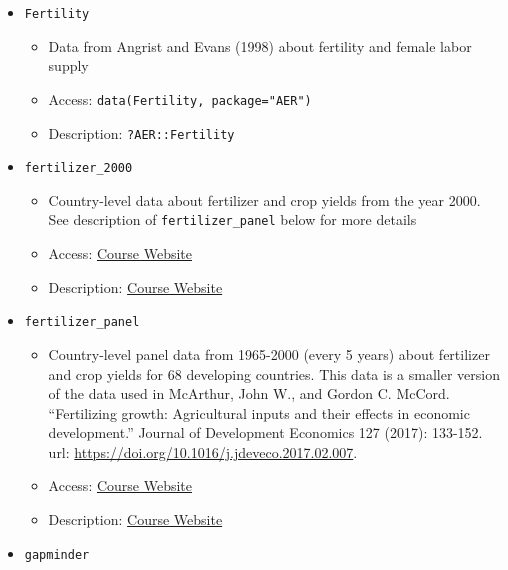 \documentclass[
  letterpaper,
  DIV=11,
  numbers=noendperiod]{scrreprt}
\begin{document}
\begin{itemize}
  \begin{itemize}
  \item
    State-level panel data about drunk driving laws and traffic
    fatalities
  \item
    Access: \texttt{data(Fatality,\ package="AER")}
  \item
    Description: \texttt{?AER::Fatality}
  \end{itemize}
\item
  \texttt{Fertility}

  \begin{itemize}
  \item
    Data from Angrist and Evans (1998) about fertility and female labor
    supply
  \item
    Access: \texttt{data(Fertility,\ package="AER")}
  \item
    Description: \texttt{?AER::Fertility}
  \end{itemize}
\item
  \texttt{fertilizer\_2000}

  \begin{itemize}
  \item
    Country-level data about fertilizer and crop yields from the year
    2000. See description of \texttt{fertilizer\_panel} below for more
    details
  \item
    Access: \href{\%60r\%20course_website_link\%60}{Course Website}
  \item
    Description: \href{\%60r\%20course_website_link\%60}{Course Website}
  \end{itemize}
\item
  \texttt{fertilizer\_panel}

  \begin{itemize}
  \item
    Country-level panel data from 1965-2000 (every 5 years) about
    fertilizer and crop yields for 68 developing countries. This data is
    a smaller version of the data used in McArthur, John W., and Gordon
    C. McCord. ``Fertilizing growth: Agricultural inputs and their
    effects in economic development.'' Journal of Development Economics
    127 (2017): 133-152. url:
    \url{https://doi.org/10.1016/j.jdeveco.2017.02.007}.
  \item
    Access: \href{\%60r\%20course_website_link\%60}{Course Website}
  \item
    Description: \href{\%60r\%20course_website_link\%60}{Course Website}
  \end{itemize}
\item
  \texttt{gapminder}


\end{itemize}
\end{document}
